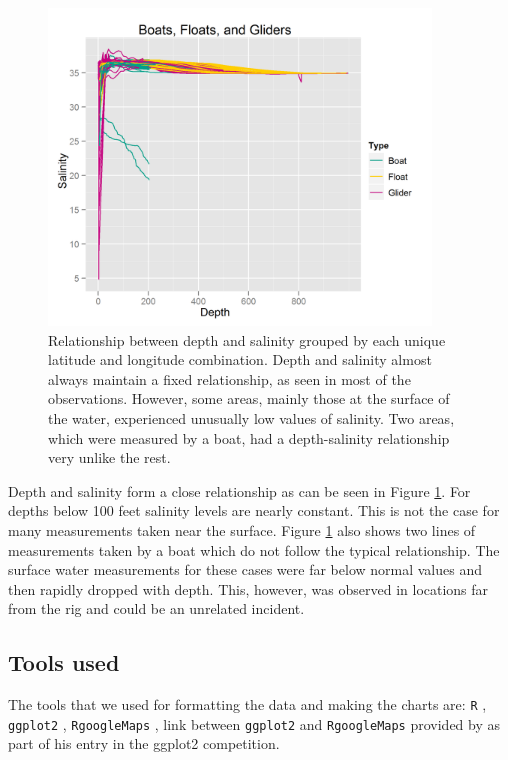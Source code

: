 \documentclass[authoryear,12pt]{elsarticle}
\begin{document}
\begin{figure}[htbp] %
   \centering
   \includegraphics[width=4in]{deapth-salinity.png} 
   \caption{Relationship between depth and salinity grouped by each unique latitude and longitude combination. Depth and salinity almost always maintain a fixed relationship, as seen in most of the observations. However, some areas, mainly those at the surface of the water, experienced unusually low values of salinity. Two areas, which were measured by a boat, had a depth-salinity relationship very unlike the rest.}
   \label{Depth-Salinity}
\end{figure}
Depth and salinity form a close relationship as can be seen in Figure \ref{Depth-Salinity}. For depths below 100 feet salinity levels are nearly constant. This is not the case for many measurements taken near the surface. Figure \ref{Depth-Salinity}  also shows  two lines of measurements taken by a boat which do not follow the {typical} relationship. The surface water measurement{s for these cases were} far below normal {values} and {then rapidly} dropped  with depth. This, however, was {observed} in locations far from the rig and {could be an} unrelated incident.

\subsection{Tools used}
The tools that we used for formatting the data and making the charts are:
{\tt R} \citep{R2011}, {\tt ggplot2} \citep{ggplot2}, {\tt RgoogleMaps} \citep{RgoogleMaps}, link between {\tt ggplot2} and {\tt RgoogleMaps} provided by \citet{kahle2010} as part of his entry in the ggplot2 competition.
\end{document}
